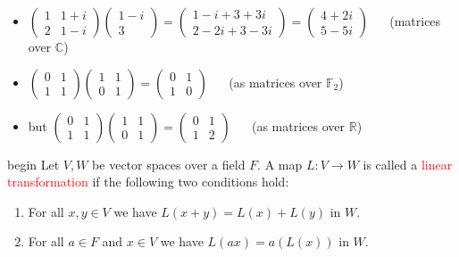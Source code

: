\documentclass[
  12pt,
  a4paper,
  twoside]{article}
\providecommand{\tightlist}{%
  \setlength{\itemsep}{0pt}\setlength{\parskip}{0pt}}
\theoremstyle{plain}
\theoremstyle{definition}
\begin{document}
\begin{itemize}
\tightlist
\item
  \(\begin{pmatrix} 1 & 1+i \\ 2 & 1-i \end{pmatrix} \begin{pmatrix} 1-i \\ 3 \end{pmatrix} = \begin{pmatrix} 1-i + 3+3i \\ 2-2i + 3-3i \end{pmatrix} = \begin{pmatrix} 4+2i \\ 5-5i \end{pmatrix}\) ~~ (matrices over \(\mathbb{C}\))
\item
  \(\begin{pmatrix} 0 & 1 \\ 1 & 1 \end{pmatrix} \begin{pmatrix} 1 & 1 \\ 0 & 1 \end{pmatrix} = \begin{pmatrix} 0 & 1 \\ 1 & 0 \end{pmatrix}\) ~~ (as matrices over \(\mathbb{F}_{2}\))
\item
  but \(\begin{pmatrix} 0 & 1 \\ 1 & 1 \end{pmatrix} \begin{pmatrix} 1 & 1 \\ 0 & 1 \end{pmatrix} = \begin{pmatrix} 0 & 1 \\ 1 & 2 \end{pmatrix}\) ~~ (as matrices over \(\mathbb{R}\))
\end{itemize}

\csname begin\label{cnj:defn-lt}
Let \(V, W\) be vector spaces over a field \(F\).
A map \(L: V \to W\) is called a \textcolor{red}{linear transformation} if the following two conditions hold:

\begin{enumerate}
\def\labelenumi{(\alph{enumi})}
\tightlist
\item
  For all \(x,y \in V\) we have \(L(x + y) = L(x) + L(y)\) in \(W\).
\item
  For all \(a \in F\) and \(x \in V\) we have \(L(ax) = a(L(x))\) in \(W\).
\end{enumerate}
\end{document}
